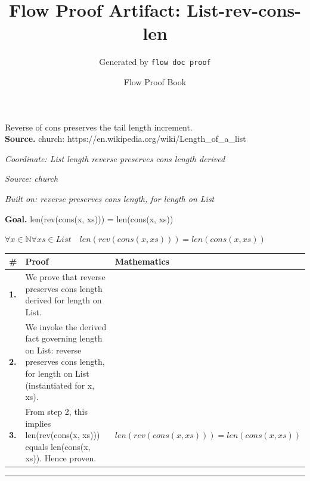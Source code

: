 \documentclass[11pt]{article}
\title{Flow Proof Artifact: List-rev-cons-len}
\author{Generated by \texttt{flow doc proof}}
\date{Flow Proof Book}
\theoremstyle{definition}
\begin{document}
\maketitle
Reverse of cons preserves the tail length increment.\\[0.5em]
\textbf{Source.} church: https://en.wikipedia.org/wiki/Length\_of\_a\_list\\[0.5em]
\bigskip
{}\par
\smallskip\noindent\textit{Coordinate: List \cdot length \cdot reverse preserves cons length derived}\par
\smallskip\noindent\textit{Source: church}\par
\smallskip\noindent\textit{Built on: reverse preserves cons length, for length on List}\par
\medskip
\noindent\textbf{Goal.} len(rev(cons(x, xs))) = len(cons(x, xs))\par
\noindent$\displaystyle \forall x \in \mathbb{N} \forall xs \in List\quad len(rev(cons(x, xs))) = len(cons(x, xs))$\par
\medskip
\noindent
\begin{tabular}{@{} >{\raggedright\arraybackslash}p{} >{\raggedright\arraybackslash}p{} >{\raggedleft\arraybackslash}p{} @{}}
\textbf{\#} & \textbf{Proof} & \textbf{Mathematics} \\
\midrule
\textbf{1.} & We prove that reverse preserves cons length derived for length on List. & \\[0.45em]
\textbf{2.} & We invoke the derived fact governing length on List: reverse preserves cons length, for length on List (instantiated for x, xs). & \\[0.45em]
\textbf{3.} & From step 2, this implies len(rev(cons(x, xs))) equals len(cons(x, xs)). Hence proven. & $\displaystyle len(rev(cons(x, xs))) = len(cons(x, xs))$ \\[0.45em]
\bottomrule
\end{tabular}
\label{thm:List-length-reverse_preserves_cons_length_derived}
\par\medskip\hrule
\end{document}
